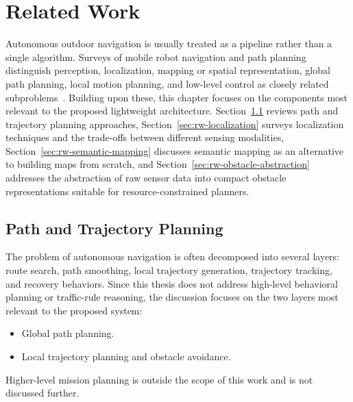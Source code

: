 
\chapter{Related Work}
\label{chap:related-work}

Autonomous outdoor navigation is usually treated as a pipeline rather than a single algorithm. Surveys of mobile robot navigation and path planning distinguish perception, localization, mapping or spatial representation, global path planning, local motion planning, and low-level control as closely related subproblems~\cite{pandey2017review,karur2021survey}. 
Building upon these, this chapter focuses on the components most relevant to the proposed lightweight architecture. Section~\ref{sec:rw-path-planning} reviews path and trajectory planning approaches, Section~\ref{sec:rw-localization} surveys localization techniques and the trade-offs between different sensing modalities, Section~\ref{sec:rw-semantic-mapping} discusses semantic mapping as an alternative to building maps from scratch, and Section~\ref{sec:rw-obstacle-abstraction} addresses the abstraction of raw sensor data into compact obstacle representations suitable for resource-constrained planners.

\section{Path and Trajectory Planning}
\label{sec:rw-path-planning}

The problem of autonomous navigation is often decomposed into several layers: route search, path smoothing, local trajectory generation, trajectory tracking, and recovery behaviors. Since this thesis does not address high-level behavioral planning or traffic-rule reasoning, the discussion focuses on the two layers most relevant to the proposed system:
\begin{itemize}
    \item Global path planning.
    \item Local trajectory planning and obstacle avoidance.
\end{itemize} 
Higher-level mission planning is outside the scope of this work and is not discussed further.

